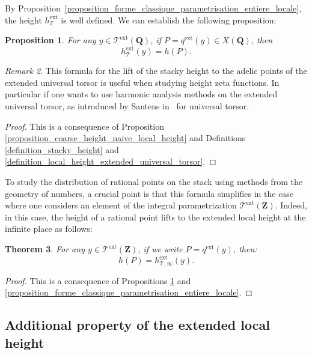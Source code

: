 \documentclass{proc-l}
\newcommand{\Z}{\mathbf{Z}}
\newcommand{\Q}{\mathbf{Q}}
\DeclareMathOperator{\ext}{ext}
\newcommand{\stackT}{\mathcal{T}}
\newtheorem{theorem}{Theorem}[section]
\newtheorem{prop}[theorem]{Proposition}
\theoremstyle{definition}
\theoremstyle{remark}
\newtheorem{remark}[theorem]{Remark}
\numberwithin{equation}{section}
\begin{document}
By Proposition~\ref{proposition_forme_classique_parametrisation_entiere_locale}, the height $h_{\stackT}^{\ext}$ is well defined. We can establish the following proposition:

\begin{prop}\label{proposition_adelic_lift_height_univ_torsor}
For any $y \in \stackT^{\ext}(\Q)$, if $P = q^{\ext}(y) \in X(\Q)$, then
\[
h^{\ext}_{\stackT}(y)
=
h(P).
\]
\end{prop}

\begin{remark}
This formula for the lift of the stacky height to the adelic points of the extended universal torsor is useful when studying height zeta functions. In particular if one wants to use harmonic analysis methods on the extended universal torsor, as introduced by Santens
in~\cite{santens2025maninsconjectureintegralpoints} for universal torsor.
\end{remark}

\begin{proof}
This is a consequence of Proposition \ref{proposition_coarse_height_naive_local_height} and Definitions \ref{definition_stacky_height} and \ref{definition_local_height_extended_universal_torsor}.    
\end{proof}

To study the distribution of rational points on the stack using methods from the geometry of numbers, a crucial point is that this formula simplifies in the case where one considers an element of the integral parametrization $\stackT^{\ext}(\Z)$. Indeed, in this case, the height of a rational point lifts to the extended local height at the infinite place as follows:


\begin{theorem}\label{theorem_lift_height_extend_universal_torsor}
    For any $y \in \stackT^{\ext}(\Z)$, if we write $P = q^{\ext}(y)$, then:
    $$h(P) = h^{\ext}_{\stackT,\infty}(y) .$$
\end{theorem}

\begin{proof}
    This is a consequence of Propositions \ref{proposition_adelic_lift_height_univ_torsor} and \ref{proposition_forme_classique_parametrisation_entiere_locale}.
\end{proof}






\subsection{Additional property of the extended local height}
\end{document}

